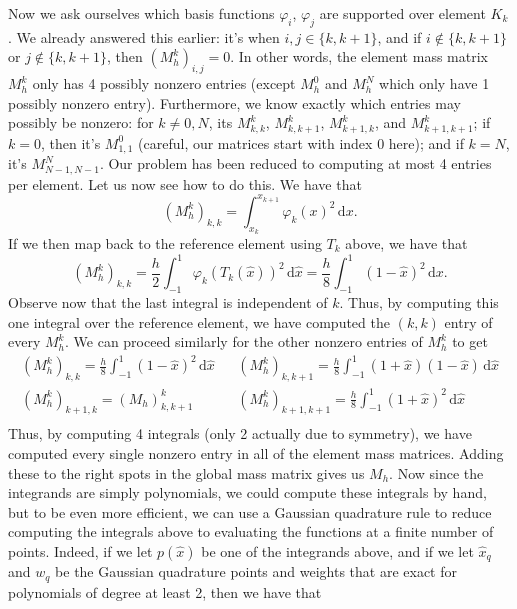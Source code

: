 \documentclass{article}
\theoremstyle{definition}
\theoremstyle{plain}
\begin{document}
Now we ask ourselves which basis functions $\varphi_i$, $\varphi_j$ are supported over element $K_k$.
We already answered this earlier: it's when $i,j \in \{k,k+1\}$, and if $i \not\in \{k,k+1\}$ or $j \not\in \{k,k+1\}$, then $(M_h^k)_{i,j} = 0$.
In other words, the element mass matrix $M_h^k$ only has 4 possibly nonzero entries (except $M_h^0$ and $M_h^N$ which only have 1 possibly nonzero entry).
Furthermore, we know exactly which entries may possibly be nonzero: for $k \neq 0,N$, its $M_{k,k}^k$, $M_{k,k+1}^k$, $M_{k+1,k}^k$, and $M_{k+1,k+1}^k$; if $k = 0$, then it's $M_{1,1}^0$ (careful, our matrices start with index $0$ here); and if $k = N$, it's $M_{N-1,N-1}^N$.
Our problem has been reduced to computing at most 4 entries per element.
Let us now see how to do this.
We have that 
\begin{equation}
  (M_h^k)_{k,k} = \int_{x_k}^{x_{k+1}}\varphi_k(x)^2\,\mathrm dx.
\end{equation}
If we then map back to the reference element using $T_k$ above, we have that 
\begin{equation}
  (M_h^k)_{k,k} = \frac{h}{2}\int_{-1}^1\varphi_k(T_k(\widehat x))^2\,\mathrm d\widehat x = \frac{h}{8} \int_{-1}^1 (1-\widehat x)^2\,\mathrm dx.
\end{equation}
Observe now that the last integral is independent of $k$.
Thus, by computing this one integral over the reference element, we have computed the $(k,k)$ entry of every $M_h^k$.
We can proceed similarly for the other nonzero entries of $M_h^k$ to get
\begin{align}
  (M_h^k)_{k,k}  = \frac{h}{8}\int_{-1}^1(1-\widehat x)^2\,\mathrm d\widehat x &&   (M_h^k)_{k,k+1}  = \frac{h}{8}\int_{-1}^1(1+\widehat x)(1-\widehat x)\,\mathrm d\widehat x \\
  (M_h^k)_{k+1,k}  = (M_h)^k_{k,k+1} &&   (M_h^k)_{k+1,k+1}  = \frac{h}{8}\int_{-1}^1 (1+\widehat x)^2\,\mathrm d\widehat x \\
\end{align}
Thus, by computing 4 integrals (only 2 actually due to symmetry), we have computed every single nonzero entry in all of the element mass matrices.
Adding these to the right spots in the global mass matrix gives us $M_h$.
Now since the integrands are simply polynomials, we could compute these integrals by hand, but to be even more efficient, we can use a Gaussian quadrature rule to reduce computing the integrals above to evaluating the functions at a finite number of points.
Indeed, if we let $p(\widehat x)$ be one of the integrands above, and if we let $\widehat x_q$ and $w_q$ be the Gaussian quadrature points and weights that are exact for polynomials of degree at least 2, then we have that 
\end{document}
